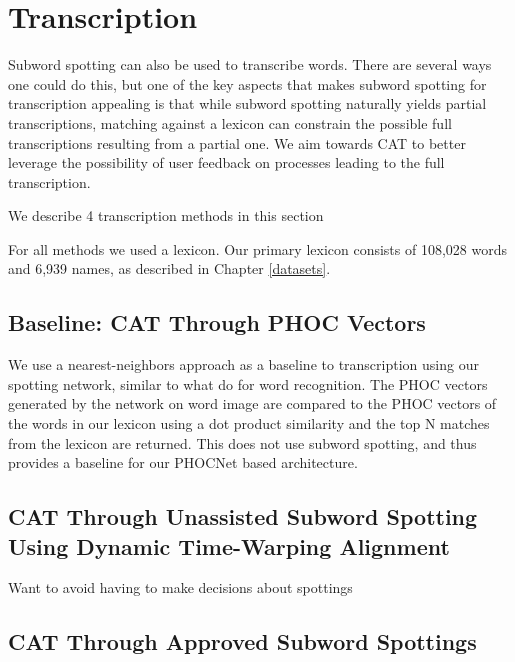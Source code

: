 \documentclass[ms,electronic,twosidetoc,letterpaper,chaptercenter,parttop,lol,lof,lot]{byumsphd}
\begin{document}
\section{Transcription}

Subword spotting can also be used to transcribe words. There are several ways one could do this, but one of the key aspects that makes subword spotting for transcription appealing is that while subword spotting naturally yields partial transcriptions, matching against a lexicon can constrain the possible full transcriptions resulting from a partial one. We aim towards CAT to better leverage the possibility of user feedback on processes leading to the full transcription.

We describe 4 transcription methods in this section

For all methods we used a lexicon. Our primary lexicon consists of 108,028 words and 6,939 names, as described in Chapter \ref{datasets}.

\subsection{Baseline: CAT Through PHOC Vectors}

We use a nearest-neighbors approach as a baseline to transcription using our spotting network, similar to what \cite{krishnan2016} do for word recognition. The PHOC vectors generated by the network on word image are compared to the PHOC vectors of the  words in our lexicon using a dot product similarity and the top N matches from the lexicon are returned. This does not use subword spotting, and thus provides a baseline for our PHOCNet based architecture.




\subsection{CAT Through Unassisted Subword Spotting Using Dynamic Time-Warping Alignment} %

Want to avoid having to make decisions about spottings


\subsection{CAT Through Approved Subword Spottings}
\end{document}
